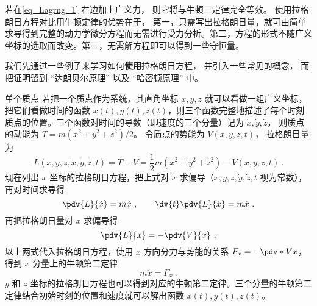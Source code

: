 若在\autoref{eq_Lagrng_1} 右边加上广义力， 则它将与牛顿三定律完全等效。 使用拉格朗日方程对比用牛顿定律的优势在于， 第一，只需写出拉格朗日量，就可由简单求导得到完整的动力学微分方程而无需进行受力分析。第二，方程的形式不随广义坐标的选取而改变。第三，无需解方程即可以得到一些守恒量。

我们先通过一些例子来学习如何\textbf{使用}拉格朗日方程， 并引入一些常见的概念， 而把证明留到 “达朗贝尔原理” 以及 “哈密顿原理” 中。

\begin{example}{单个质点}\label{ex_Lagrng_1}
若把一个质点作为系统，其直角坐标 $x,y,z$ 就可以看做一组广义坐标，把它们看做时间的函数 $x(t), y(t), z(t)$，则三个函数完整地描述了每个时刻质点的位置。三个函数对时间的导数（即速度的三个分量）记为 $\dot x, \dot y, \dot z$， 则质点的动能为 $T=m(\dot x^2+\dot y^2+\dot z^2)/2$。 令质点的势能为 $V(x,y,z,t)$， 拉格朗日量为
\begin{equation}
L(x,y,z, \dot x, \dot y, \dot z, t) = T-V = \frac12 m(\dot x^2+\dot y^2+\dot z^2) - V(x,y,z,t)~.
\end{equation}
现在列出 $x$ 坐标的拉格朗日方程，把上式对 $\dot x$ 求偏导（$x, y,z, \dot y, \dot z, t$ 视为常数），再对时间求导得
\begin{equation}
\pdv{L}{\dot x} = m\dot x~,
\qquad
\dv{t} \pdv{L}{\dot x} = m\ddot x~.
\end{equation}
再把拉格朗日量对 $x$ 求偏导得
\begin{equation}
\pdv{L}{x} = -\pdv{V}{x}~,
\end{equation}
以上两式代入拉格朗日方程，使用 $x$ 方向分力与势能的关系 $F_x = -\pdv*{V}{x}$， 得到 $x$ 分量上的牛顿第二定律
\begin{equation}
m\ddot x = F_x~.
\end{equation}
$y$ 和 $z$ 坐标的拉格朗日方程也可以得到对应的牛顿第二定律。三个分量的牛顿第二定律结合初始时刻的位置和速度就可以解出函数 $x(t), y(t), z(t)$。 
\end{example}

